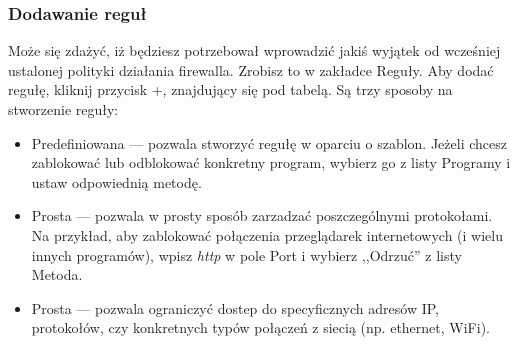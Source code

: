 \subsubsection{Dodawanie reguł}
Może się zdażyć, iż będziesz potrzebował wprowadzić jakiś wyjątek od wcześniej ustalonej polityki działania firewalla. Zrobisz to w zakładce \textcolor{ubuntu_orange}{Reguły}. Aby dodać regułę, kliknij przycisk +, znajdujący się pod tabelą. Są trzy sposoby na stworzenie reguły:
\begin{itemize}
\item \textcolor{ubuntu_orange}{Predefiniowana} --- pozwala stworzyć regułę w oparciu o szablon. Jeżeli chcesz zablokować lub odblokować konkretny program, wybierz go z listy \textcolor{ubuntu_orange}{Programy} i ustaw odpowiednią metodę.
\item \textcolor{ubuntu_orange}{Prosta} --- pozwala w prosty sposób zarzadzać poszczególnymi protokołami. Na przykład, aby zablokować połączenia przeglądarek internetowych (i wielu innych programów), wpisz \textit{http} w pole \textcolor{ubuntu_orange}{Port} i wybierz ,,Odrzuć'' z listy \textcolor{ubuntu_orange}{Metoda}.
\item \textcolor{ubuntu_orange}{Prosta} --- pozwala ograniczyć dostep do specyficznych adresów IP, protokołów, czy konkretnych typów połączeń z siecią (np. ethernet, WiFi).
\end{itemize}
